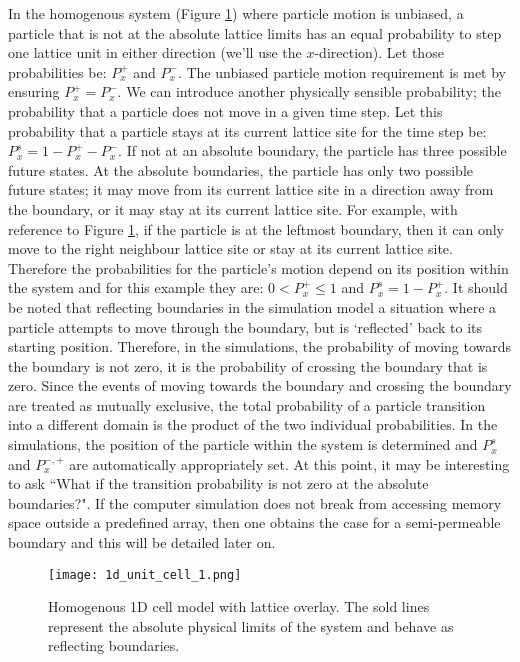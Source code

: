 	In the homogenous system (Figure \ref{fig:1d_unit_cell_1.png}) where particle motion is unbiased, a particle that is not at the absolute lattice limits has an equal probability to step one lattice unit in either direction (we'll use the $ x $-direction). Let those probabilities be: $ P_x^+ $ and $ P_x^- $. The unbiased particle motion requirement is met by ensuring $ P_x^+ = P_x^- $. We can introduce another physically sensible probability; the probability that a particle does not move in a given time step. Let this probability that a particle stays at its current lattice site for the time step be: $ P_x^s = 1 - P_x^+ - P_x^- $. If not at an absolute boundary, the particle has three possible future states. At the absolute boundaries, the particle has only two possible future states; it may move from its current lattice site in a direction away from the boundary, or it may stay at its current lattice site. For example, with reference to Figure \ref{fig:1d_unit_cell_1.png}, if the particle is at the leftmost boundary, then it can only move to the right neighbour lattice site or stay at its current lattice site. Therefore the probabilities for the particle's motion depend on its position within the system and for this example they are: $ 0 < P_x^+ \leq 1 $ and $ P_x^s = 1 - P_x^+ $. It should be noted that reflecting boundaries in the simulation model a situation where a particle attempts to move through the boundary, but is `reflected' back to its starting position. Therefore, in the simulations, the probability of moving towards the boundary is not zero, it is the probability of crossing the boundary that is zero. Since the events of moving towards the boundary and crossing the boundary are treated as mutually exclusive, the total probability of a particle transition into a different domain is the product of the two individual probabilities. In the simulations, the position of the particle within the system is determined and $ P_x^s $ and $ P_x^{-,+} $ are automatically appropriately set. At this point, it may be interesting to ask ``What if the transition probability is not zero at the absolute boundaries?". If the computer simulation does not break from accessing memory space outside a predefined array, then one obtains the case for a semi-permeable boundary and this will be detailed later on.
	
	\begin{figure}[h]
		\centering
		\texttt{[image: 1d\_unit\_cell\_1.png]}
		\caption{Homogenous 1D cell model with lattice overlay. The sold lines represent the absolute physical limits of the system and behave as reflecting boundaries.}
		\label{fig:1d_unit_cell_1.png}
		\end{figure}	
	
